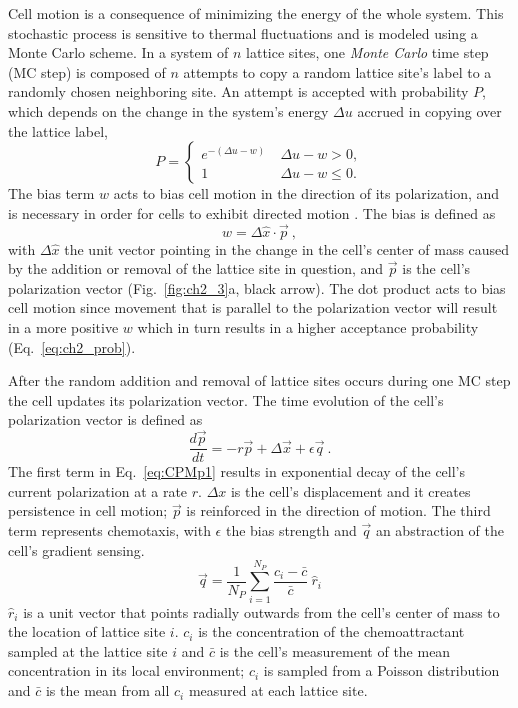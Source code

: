 Cell motion is a consequence of minimizing the energy of the whole system. This stochastic process is sensitive to thermal fluctuations and is modeled using a Monte Carlo scheme. In a system of $n$ lattice sites, one \textit{Monte Carlo} time step (MC step) is composed of $n$ attempts to copy a random lattice site's label to a randomly chosen neighboring site. An attempt is accepted with probability $P$, which depends on the change in the system's energy $\Delta u$ accrued in copying over the lattice label,
\begin{equation} \label{eq:ch2_prob}
    P =
    \begin{cases}
        e^{-\left( \Delta u - w \right)} &\ \Delta u - w > 0 , \\
        1 &\ \Delta u - w \leq 0 .
    \end{cases}
\end{equation}
The bias term $w$ acts to bias cell motion in the direction of its polarization, and is necessary in order for cells to exhibit directed motion \cite{szabo2010collective}.
The bias is defined as
\begin{equation}
    w = \Delta\hat{x} \cdot \vec{p} \ ,
\end{equation}
with $\Delta\hat{x}$ the unit vector pointing in the change in the cell's center of mass caused by the addition or removal of the lattice site in question, and $\vec{p}$ is the cell's polarization vector (Fig.\ \ref{fig:ch2_3}a, black arrow). The dot product acts to bias cell motion since movement that is parallel to the polarization vector will result in a more positive $w$ which in turn results in a higher acceptance probability (Eq.\ \ref{eq:ch2_prob}).

After the random addition and removal of lattice sites occurs during one MC step the cell updates its polarization vector. The time evolution of the cell's polarization vector is defined as
\begin{equation} \label{eq:CPMp1}
    \frac{d\vec{p}}{dt} = -r\vec{p} + \Delta\vec{x} + \epsilon \vec{q}\ .
\end{equation}
The first term in Eq.\ \ref{eq:CPMp1} results in exponential decay of the cell's current polarization at a rate $r$. $\Delta x$ is the cell's displacement and it creates persistence in cell motion; $\vec{p}$ is reinforced in the direction of motion. The third term represents chemotaxis, with $\epsilon$ the bias strength and $\vec{q}$ an abstraction of the cell's gradient sensing.
\begin{equation} \label{eq:CPMq1}
    \vec{q} = \frac{1}{N_P} \sum_{i=1}^{N_P} \frac{c_i-\bar{c}}{\bar{c}} \ \hat{r}_i
\end{equation}
$\hat{r}_i$ is a unit vector that points radially outwards from the cell's center of mass to the location of lattice site $i$. $c_i$ is the concentration of the chemoattractant sampled at the lattice site $i$ and $\bar{c}$ is the cell's measurement of the mean concentration in its local environment; $c_i$ is sampled from a Poisson distribution and $\bar{c}$ is the mean from all $c_i$ measured at each lattice site.



